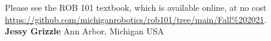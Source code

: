 Please see the ROB 101 textbook, which is available online, at no cost \url{https://github.com/michiganrobotics/rob101/tree/main/Fall%202021}. \\

\textbf{Jessy Grizzle}
Ann Arbor, Michigan USA